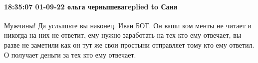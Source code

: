  
 
 
 
 

\paragraph{18:35:07 01-09-22 ольга чернышеваreplied to Саня}

Мужчины! Да услышьте вы наконец. Иван БОТ. Он ваши ком менты не читает и
никогда на них не ответит, ему нужно заработать на тех кто ему отвечает, вы
разве не заметили как он тут же свои простыни отправляет тому кто ему ответил.
О получает деньги за тех кто ему отвечает.
